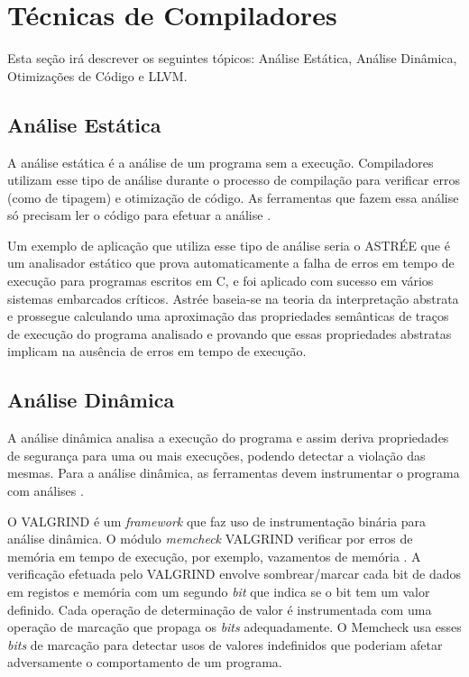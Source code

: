 \section{Técnicas de Compiladores}
\label{sec:compiladores}
Esta seção irá descrever os seguintes tópicos: Análise Estática, Análise Dinâmica, Otimizações de Código e LLVM.

\subsection{Análise Estática}
A análise estática é a análise de um programa sem a execução. Compiladores utilizam esse tipo de análise durante o processo de compilação para verificar erros (como de tipagem) e otimização de código. As ferramentas que fazem essa análise só precisam ler o código para efetuar a análise \cite{Rocha:2015tese}.

\par
Um exemplo de aplicação que utiliza esse tipo de análise seria o ASTRÉE \cite{Cousot:2005} que é um analisador estático que prova automaticamente a falha de erros em tempo de execução para programas escritos em C, e foi aplicado com sucesso em vários sistemas embarcados críticos. 
%
Astrée baseia-se na teoria da interpretação abstrata \cite{Cousot:1977} e prossegue calculando uma aproximação das propriedades semânticas de traços de execução do programa analisado e provando que essas propriedades abstratas implicam na ausência de erros em tempo de execução. 

\subsection{Análise Dinâmica}
\label{sub:dinamica}
A análise dinâmica analisa a execução do programa e assim deriva propriedades de segurança para uma ou mais execuções, podendo detectar a violação das mesmas. Para a análise dinâmica, as ferramentas devem instrumentar o programa com análises \cite{Rocha:2015tese}. 

\par
O VALGRIND \cite{Nethercote:2007} é um \textit{framework} que faz uso de instrumentação binária para análise dinâmica. O módulo \textit{memcheck} VALGRIND verificar por erros de memória em tempo de execução, por exemplo, vazamentos de memória \cite{CHENG:2006}. 
%
A verificação efetuada pelo VALGRIND envolve sombrear/marcar cada bit de dados em registos e memória com um segundo \textit{bit} que indica se o bit tem um valor definido. Cada operação de determinação de valor é instrumentada com uma operação de marcação que propaga os \textit{bits} adequadamente. O Memcheck usa esses \textit{bits} de marcação para detectar usos de valores indefinidos que poderiam afetar adversamente o comportamento de um programa.


